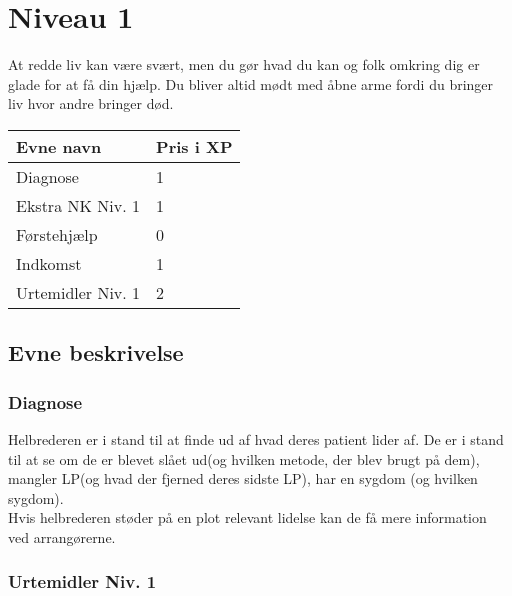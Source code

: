 \chapter*{Niveau 1}
At redde liv kan være svært, men du gør hvad du kan og folk omkring dig er glade for at få din hjælp. Du bliver altid mødt med åbne arme fordi du bringer liv hvor andre bringer død.
\begin{table}[H]
    \centering
    \begin{tabular}{|p{}|p{}|}
    \rowcolor{cerulean!80}\hline
        Evne navn & Pris i XP \\\hline
        Diagnose & 1\\\hline
        Ekstra NK Niv. 1 & 1\\\hline
        Førstehjælp & 0\\\hline
        Indkomst &1 \\\hline
        Urtemidler Niv. 1 & 2\\\hline
    \end{tabular}
\end{table}

\section*{Evne beskrivelse}

\subsection*{Diagnose}
Helbrederen er i stand til at finde ud af hvad deres patient lider af. De er i stand til at se om de er blevet slået ud(og hvilken metode, der blev brugt på dem), mangler LP(og hvad der fjerned deres sidste LP), har en sygdom (og hvilken sygdom).\\
Hvis helbrederen støder på en plot relevant lidelse kan de få mere information ved arrangørerne.







\subsection*{Urtemidler Niv. 1}

